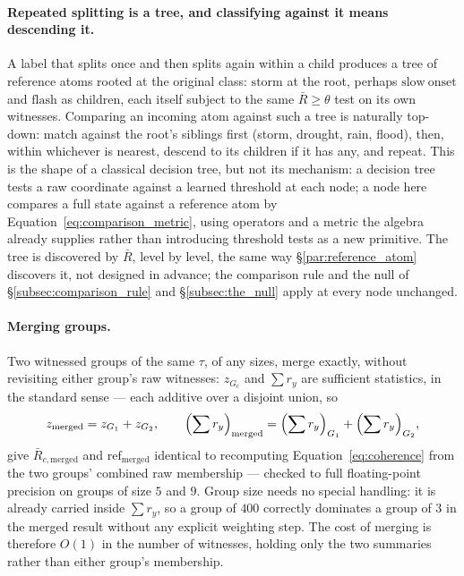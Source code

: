 \documentclass[12pt, a4paper]{article}
\begin{document}
\paragraph{Repeated splitting is a tree, and classifying against it
means descending it.} A label that splits once and then splits again
within a child produces a tree of reference atoms rooted at the
original class: $\mathrm{storm}$ at the root, perhaps $\mathrm{slow\
onset}$ and $\mathrm{flash}$ as children, each itself subject to the
same $\bar R\ge\theta$ test on its own witnesses. Comparing an
incoming atom against such a tree is naturally top-down: match against
the root's siblings first (storm, drought, rain, flood), then, within
whichever is nearest, descend to its children if it has any, and
repeat. This is the shape of a classical decision tree, but not its
mechanism: a decision tree tests a raw coordinate against a learned
threshold at each node; a node here compares a full state against a
reference atom by Equation~\eqref{eq:comparison_metric}, using
operators and a metric the algebra already supplies rather than
introducing threshold tests as a new primitive. The tree is discovered
by $\bar R$, level by level, the same way \S\ref{par:reference_atom}
discovers it, not designed in advance; the comparison rule and the
null of \S\ref{subsec:comparison_rule} and \S\ref{subsec:the_null}
apply at every node unchanged.

\paragraph{Merging groups.} Two witnessed groups of the same $\tau$,
of any sizes, merge exactly, without revisiting either group's raw
witnesses: $z_{G_c}$ and $\sum r_y$ are sufficient statistics, in the
standard sense --- each additive over a disjoint union, so
\begin{equation}
    z_{\text{merged}} = z_{G_1} + z_{G_2},
    \qquad
    \Bigl(\sum r_y\Bigr)_{\text{merged}}
    = \Bigl(\sum r_y\Bigr)_{G_1} + \Bigl(\sum r_y\Bigr)_{G_2},
    \label{eq:sufficient_stat_merge}
\end{equation}
give $\bar R_{c,\text{merged}}$ and $\mathrm{ref}_{\text{merged}}$
identical to recomputing Equation~\eqref{eq:coherence} from the two
groups' combined raw membership --- checked to full floating-point
precision on groups of size $5$ and $9$. Group size needs no special
handling: it is already carried inside $\sum r_y$, so a group of
$400$ correctly dominates a group of $3$ in the merged result without
any explicit weighting step. The cost of merging is therefore $O(1)$
in the number of witnesses, holding only the two summaries rather
than either group's membership.
\end{document}
